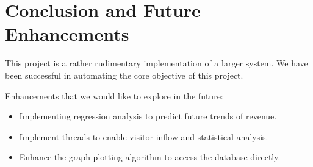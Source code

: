 \chapter{Conclusion and Future Enhancements}
This project is a rather rudimentary implementation of a larger system.
We have been successful in automating the core objective of this project.

Enhancements that we would like to explore in the future:
\begin{itemize}
\item Implementing regression analysis to predict future trends of revenue.
\item Implement threads to enable visitor inflow and statistical analysis.
\item Enhance the graph plotting algorithm to access the database directly.
\end{itemize}
